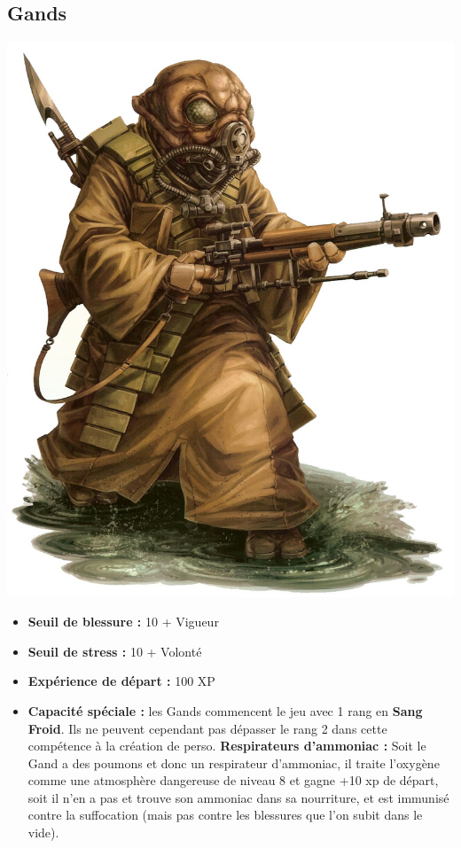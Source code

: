 \documentclass[twoside]{article}
\begin{document}
\subsection*{Gands}

\noindent\begin{minipage}{0.3\textwidth}
	\includegraphics[width=1\linewidth]{../img/species/gand}
\end{minipage}%
\hfill%
\begin{minipage}{0.7\textwidth}\raggedleft
	\begin{itemize}
		\item \textbf{Seuil de blessure :} 10 + Vigueur 
		\item \textbf{Seuil de stress :} 10 + Volonté 
		\item \textbf{Expérience de départ :} 100 XP
		\item \textbf{Capacité spéciale :} les Gands commencent le jeu avec 1 rang en \textbf{Sang Froid}. Ils ne peuvent cependant pas dépasser le rang 2 dans cette compétence à la création de perso.\textbf{		Respirateurs d'ammoniac :} Soit le Gand a des poumons et donc un respirateur d'ammoniac, il traite l'oxygène comme une atmosphère dangereuse de niveau 8 et gagne +10 xp de départ, soit il n'en a pas et trouve son ammoniac dans sa nourriture, et est immunisé contre la suffocation (mais pas contre les blessures que l'on subit dans le vide).
	\end{itemize}
\end{minipage}
\end{document}
